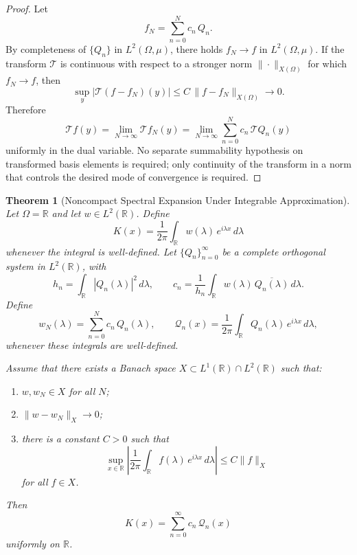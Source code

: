 \documentclass[12pt]{article}
\newtheorem{theorem}{Theorem}
\begin{document}
\begin{proof}
Let
\[
    f_N=\sum_{n=0}^N c_n\,Q_n.
\]
By completeness of $\{Q_n\}$ in $L^2(\Omega,\mu)$, there holds $f_N\to f$ in $L^2(\Omega,\mu)$. If the transform $\mathcal{T}$ is continuous with respect to a stronger norm $\|\cdot\|_{X(\Omega)}$ for which $f_N\to f$, then
\[
    \sup_y |\mathcal{T}(f-f_N)(y)| \le C\,\|f-f_N\|_{X(\Omega)} \to 0 .
\]
Therefore
\[
    \mathcal{T}f(y)=\lim_{N\to\infty}\mathcal{T}f_N(y)
    =\lim_{N\to\infty}\sum_{n=0}^N c_n\,\mathcal{T}Q_n(y)
\]
uniformly in the dual variable. No separate summability hypothesis on transformed basis elements is required; only continuity of the transform in a norm that controls the desired mode of convergence is required.
\end{proof}

\bigskip

\begin{theorem}[Noncompact Spectral Expansion Under Integrable Approximation]
Let $\Omega=\mathbb{R}$ and let $w \in L^2(\mathbb{R})$. Define
\begin{equation}
    K(x)=\frac{1}{2\pi}\int_{\mathbb{R}} w(\lambda)\,e^{i\lambda x}\,d\lambda
\end{equation}
whenever the integral is well-defined. Let $\{Q_n\}_{n=0}^\infty$ be a complete orthogonal system in $L^2(\mathbb{R})$, with
\[
    h_n=\int_{\mathbb{R}} |Q_n(\lambda)|^2\,d\lambda,
    \qquad
    c_n=\frac{1}{h_n}\int_{\mathbb{R}} w(\lambda)\,\overline{Q_n(\lambda)}\,d\lambda .
\]
Define
\[
    w_N(\lambda)=\sum_{n=0}^N c_n\,Q_n(\lambda),
    \qquad
    \mathcal{Q}_n(x)=\frac{1}{2\pi}\int_{\mathbb{R}} Q_n(\lambda)\,e^{i\lambda x}\,d\lambda ,
\]
whenever these integrals are well-defined.

Assume that there exists a Banach space $X \subset L^1(\mathbb{R})\cap L^2(\mathbb{R})$ such that:
\begin{enumerate}
    \item $w,w_N \in X$ for all $N$;
    \item $\|w-w_N\|_X \to 0$;
    \item there is a constant $C>0$ such that
    \[
        \sup_{x\in\mathbb{R}}
        \left|
        \frac{1}{2\pi}\int_{\mathbb{R}} f(\lambda)\,e^{i\lambda x}\,d\lambda
        \right|
        \le C\|f\|_X
    \]
    for all $f\in X$.
\end{enumerate}
Then
\[
    K(x)=\sum_{n=0}^\infty c_n\,\mathcal{Q}_n(x)
\]
uniformly on $\mathbb{R}$.
\end{theorem}
\end{document}
